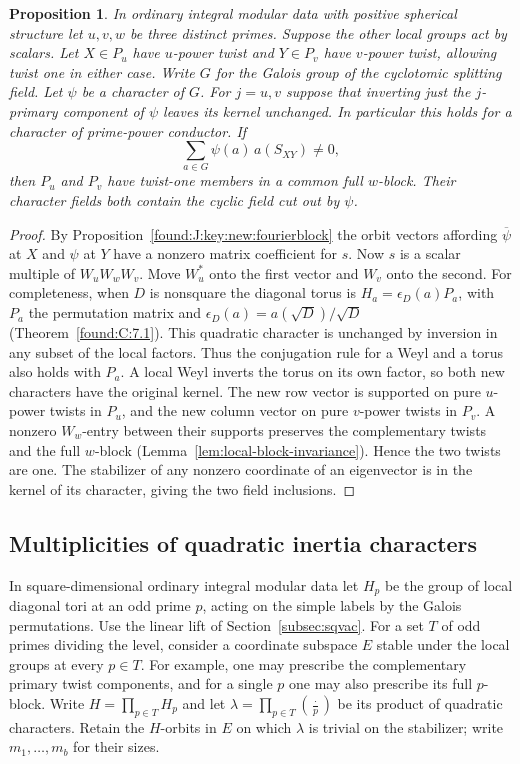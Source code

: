 \documentclass[11pt,a4paper]{article}
\numberwithin{equation}{section}
\newtheorem{proposition}[theorem]{Proposition}
\theoremstyle{remark}
\begin{document}
\begin{proposition}\label{found:J:6.2}\label{found:J:key:pr:carry}
In ordinary integral modular data with positive spherical structure let $u,v,w$ be
three distinct primes. Suppose the other local groups act by scalars.
Let $X\in P_u$ have $u$-power twist and $Y\in P_v$ have $v$-power
twist, allowing twist one in either case. Write $G$ for the Galois
group of the cyclotomic splitting field. Let $\psi$ be a character of $G$.
For $j=u,v$ suppose that inverting just the $j$-primary component
of $\psi$ leaves its kernel unchanged. In particular this holds
for a character of prime-power conductor. If
\[
                \sum_{a\in G}\psi(a)\,a(S_{XY})\ne0 ,
\]
then $P_u$ and $P_v$ have twist-one members in a common full $w$-block.
Their character fields both contain the cyclic field cut out by $\psi$.
\end{proposition}
\begin{proof}
By Proposition~\ref{found:J:key:new:fourierblock} the orbit vectors affording
$\overline\psi$ at $X$ and $\psi$ at $Y$ have a nonzero matrix
coefficient for $s$.
Now $s$ is a scalar multiple of $W_uW_wW_v$. Move $W_u^*$ onto
the first vector and $W_v$ onto the second. For completeness, when $D$
is nonsquare the diagonal torus is $H_a=\epsilon_D(a)P_a$, with
$P_a$ the permutation matrix and
$\epsilon_D(a)=a(\sqrt D)/\sqrt D$ (Theorem~\ref{found:C:7.1}). This quadratic
character is unchanged by inversion in any subset of the local factors.
Thus the conjugation rule for a Weyl and a torus also holds with $P_a$.
A local Weyl inverts
the torus on its own factor, so both new characters have the
original kernel. The new row vector
is supported on pure $u$-power twists in $P_u$, and the new column
vector on pure $v$-power twists in $P_v$. A nonzero $W_w$-entry
between their supports preserves the complementary twists and the
full $w$-block (Lemma~\ref{lem:local-block-invariance}). Hence the two twists are one.
The stabilizer of any nonzero coordinate of an eigenvector is in
the kernel of its character, giving the two field inclusions.
\end{proof}

\subsection{Multiplicities of quadratic inertia characters}\label{found:J:7}
In square-dimensional ordinary integral modular data let $H_p$ be the
group of local diagonal tori at an odd prime $p$, acting on the simple
labels by the Galois permutations. Use the linear lift of Section~\ref{subsec:sqvac}. For a set $T$ of odd primes dividing the level, consider a
coordinate subspace $E$ stable under the local groups at every $p\in T$.
For example, one may prescribe the complementary primary twist
components, and for a single $p$ one may also prescribe its full
$p$-block. Write $H=\prod_{p\in T}H_p$ and let
$\lambda=\prod_{p\in T}(\frac{\cdot}{p})$ be its product of quadratic
characters. Retain the $H$-orbits in $E$ on which $\lambda$ is trivial
on the stabilizer; write $m_1,\ldots,m_b$ for their sizes.
\end{document}
